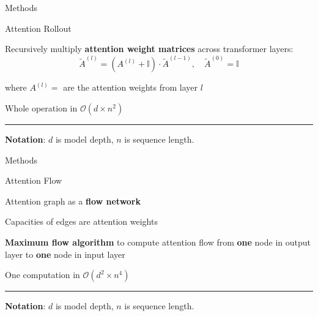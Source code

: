 \documentclass[xcolor=table]{beamer} %
\begin{document}
\begin{frame}{Methods}
    \begin{block}{\large Attention Rollout}
        \pause
        \begin{itemize}
            {\large
            \item Recursively multiply \textbf{attention weight matrices} across transformer layers: \pause
            \[
                \tilde{A}^{(l)} =  \left(A^{(l)} +  \mathbb{I} \right) \cdot \tilde{A}^{(l-1)},
                \quad \tilde{A}^{(0)} = \mathbb{I}
            \] \pause
    
            \vspace{0.5em}
    
            where $A^{(l)} = $ are the attention weights from layer $l$ \pause
            
            \vspace{0.5em}

            \item Whole operation in $\mathcal{O}(d \times n^2)$ \pause
            }
        \end{itemize}
        \vspace{0.5em}
        \hrule
        \vspace{0.1em}
        {\scriptsize \textbf{Notation}: $d$ is model depth, $n$ is sequence length.}
    \end{block}
\end{frame}

\begin{frame}{Methods}
    \begin{block}{\large Attention Flow}
        \begin{itemize}
            \pause
            {\large
            \setlength{\itemsep}{0.5em}
            \item Attention graph as a \textbf{flow network} \pause
            
            \item Capacities of edges are attention weights \pause
            \item \textbf{Maximum flow algorithm} to compute attention flow from \textbf{one} node in output layer to \textbf{one} node in input layer \pause
            \item One computation in $\mathcal{O}(d^2 \times n^4)$
            }
        \end{itemize}
        \vspace{0.5em}
        \hrule
        \vspace{0.1em}
        {\scriptsize \textbf{Notation}: $d$ is model depth, $n$ is sequence length.}
    \end{block}
\end{frame}
\end{document}

